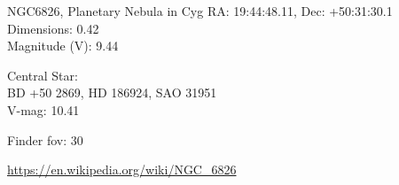 \begin{block}{NGC6826, Planetary Nebula in Cyg}
    RA: 19:44:48.11, Dec: +50:31:30.1 \\ 
    Dimensions: 0.42 \\ 
    Magnitude (V): 9.44

    Central Star: \\ 
      \hspace{1em}BD +50 2869, HD 186924, SAO 31951 \\ 
      \hspace{1em}V-mag: 10.41 


    Finder fov: 30 

    \url{https://en.wikipedia.org/wiki/NGC_6826} 
\end{block}